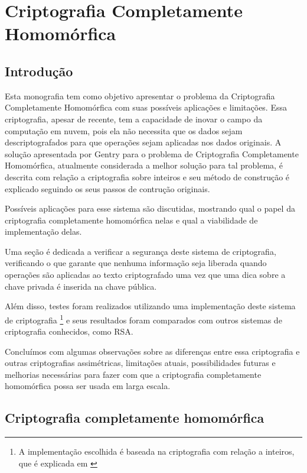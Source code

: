 \chapter{Criptografia Completamente Homomórfica}\label{chp:LABEL_CHP_1}

\section{Introdução}\label{sec:LABEL_CHP_1_SEC_A}
Esta monografia tem como objetivo apresentar o problema da Criptografia Completamente Homomórfica com suas possíveis aplicações e limitações.
Essa criptografia, apesar de recente, tem a capacidade de inovar o campo da computação em nuvem, pois ela não necessita que os dados sejam descriptografados para que operações sejam aplicadas nos dados originais.
A solução apresentada por Gentry para o problema de Criptografia Completamente Homomórfica, atualmente considerada a melhor solução para tal problema, é descrita com relação a criptografia sobre inteiros e seu método de construção é explicado seguindo os seus passos de contrução originais.

Possíveis aplicações para esse sistema são discutidas, mostrando qual o papel da criptografia completamente homomórfica nelas e qual a viabilidade de implementação delas.

Uma seção é dedicada a verificar a segurança deste sistema de criptografia, verificando o que garante que nenhuma informação seja liberada quando operações são aplicadas ao texto criptografado uma vez que uma dica sobre a chave privada é inserida na chave pública.

Além disso, testes foram realizados utilizando uma implementação deste sistema de criptografia \footnote{A implementação escolhida é baseada na criptografia com relação a inteiros, que é explicada em \cite{art:REF_ART_1}} e seus resultados foram comparados com outros sistemas de criptografia conhecidos, como RSA.

Concluímos com algumas observações sobre as diferenças entre essa criptografia e outras criptografias assimétricas, limitações atuais, possibilidades futuras e melhorias necessárias para fazer com que a criptografia completamente homomórfica possa ser usada em larga escala.

\newpage

\section{Criptografia completamente homomórfica}\label{sec:LABEL_CHP_1_SEC_B}
